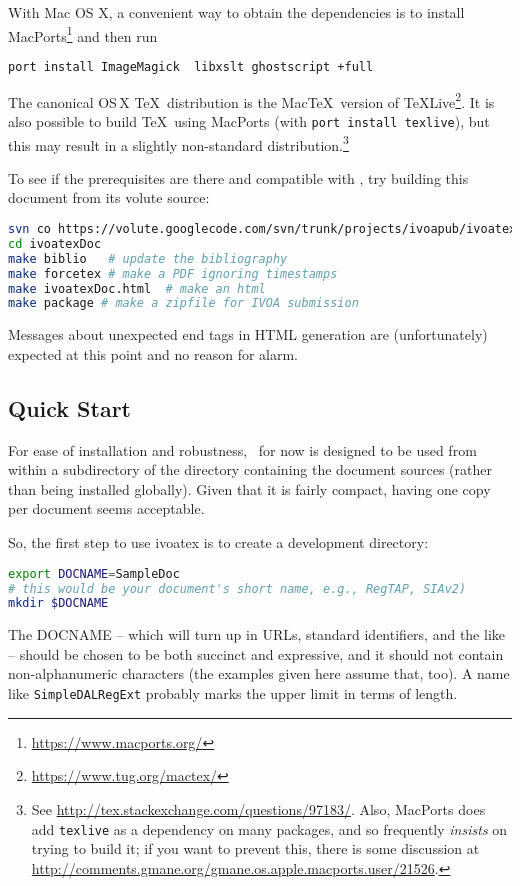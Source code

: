 \documentclass[11pt,a4paper]{ivoa}
\begin{document}
With Mac OS X, a convenient way to obtain the dependencies is to install
MacPorts\footnote{\url{https://www.macports.org/}} and then run
\begin{lstlisting}[language=sh]
port install ImageMagick  libxslt ghostscript +full
\end{lstlisting}
The canonical OS\,X \TeX\ distribution is the Mac\TeX\ version of
\TeX Live\footnote{\url{https://www.tug.org/mactex/}}.  It is also
possible to build \TeX\ using MacPorts (with \texttt{port install
  texlive}), but this may result in a slightly non-standard
distribution.\footnote{See
  \url{http://tex.stackexchange.com/questions/97183/}.
  Also, MacPorts does add
  \texttt{texlive} as a dependency on many packages, and so frequently
  \emph{insists} on trying to build it; if you want to prevent this,
  there is some discussion at
  \url{http://comments.gmane.org/gmane.os.apple.macports.user/21526}.}

To see if the prerequisites are there and compatible with \ivoatex, try
building this document from its volute source:
\begin{lstlisting}[language=sh]
svn co https://volute.googlecode.com/svn/trunk/projects/ivoapub/ivoatexDoc
cd ivoatexDoc
make biblio   # update the bibliography
make forcetex # make a PDF ignoring timestamps
make ivoatexDoc.html  # make an html
make package # make a zipfile for IVOA submission
\end{lstlisting}
Messages about unexpected end tags in HTML generation are
(unfortunately) expected at this point and no reason for alarm.

\subsection{Quick Start}

For ease of installation and robustness, \ivoatex\ for now is designed
to be used from within a subdirectory of the directory containing the
document sources (rather than being installed globally).  Given that
it is fairly compact, having one copy per document seems acceptable.

So, the first step to use ivoatex is to create a development
directory:

\begin{lstlisting}[language=sh]
export DOCNAME=SampleDoc
# this would be your document's short name, e.g., RegTAP, SIAv2)
mkdir $DOCNAME
\end{lstlisting}

The DOCNAME -- which will turn up in URLs, standard identifiers, and the
like -- should be chosen to be both succinct and expressive, and it
should not contain non-alphanumeric characters (the examples given here
assume that, too).  A name
like \texttt{SimpleDALRegExt} probably marks the upper limit in terms of
length.
\end{document}

